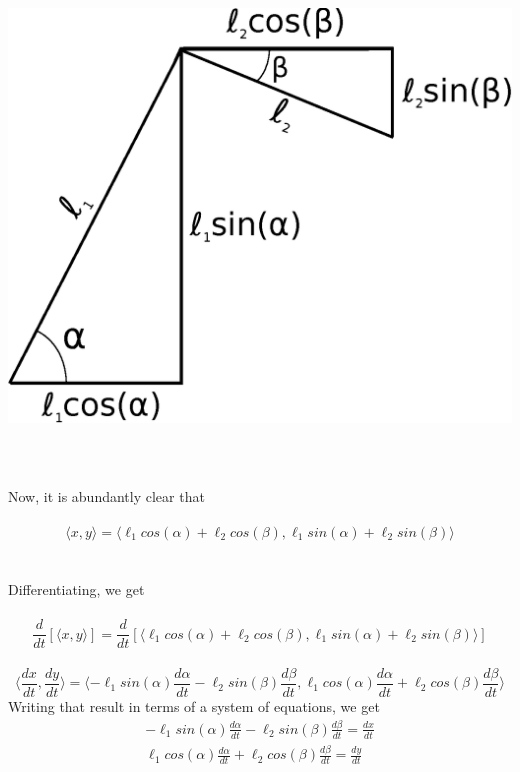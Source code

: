 \documentclass{article}
\begin{document}
\includegraphics[width=\textwidth]{drawing3.eps}
\\
\\
\\
\\
Now, it is abundantly clear that
\\
\\
\begin{equation} \label{position}
\langle x, y \rangle = \langle \ell_1cos(\alpha) + \ell_2cos(\beta), \ell_1sin(\alpha) + \ell_2sin(\beta) \rangle
\end{equation}
\\
\\
Differentiating, we get
\\
\\
\begin{equation*}
\frac{d}{dt}[\langle x, y \rangle] = \frac{d}{dt}[\langle \ell_1cos(\alpha) + \ell_2cos(\beta), \ell_1sin(\alpha) + \ell_2sin(\beta) \rangle]
\end{equation*}
\\
\begin{equation}
\langle \frac{dx}{dt}, \frac{dy}{dt} \rangle = \langle -\ell_1sin(\alpha)\frac{d\alpha}{dt} - \ell_2sin(\beta)\frac{d\beta}{dt}, \ell_1cos(\alpha)\frac{d\alpha}{dt} + \ell_2cos(\beta)\frac{d\beta}{dt} \rangle
\end{equation}
Writing that result in terms of a system of equations, we get
\\
\begin{align*}
-\ell_1sin(\alpha)\frac{d\alpha}{dt} - \ell_2sin(\beta)\frac{d\beta}{dt} = \frac{dx}{dt}\\
\ell_1cos(\alpha)\frac{d\alpha}{dt} + \ell_2cos(\beta)\frac{d\beta}{dt} = \frac{dy}{dt}\\
\end{align*}
\end{document}
